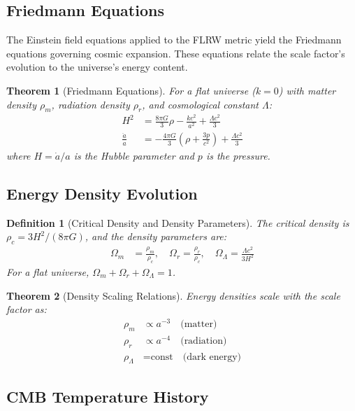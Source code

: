 \documentclass[a4paper, 11pt]{article}
\newtheorem{definition}{Definition}[section]
\newtheorem{theorem}{Theorem}[section]
\begin{document}
\subsection{Friedmann Equations}

The Einstein field equations applied to the FLRW metric yield the Friedmann equations governing
cosmic expansion. These equations relate the scale factor's evolution to the universe's energy content.

\begin{theorem}[Friedmann Equations]
For a flat universe ($k=0$) with matter density $\rho_m$, radiation density $\rho_r$, and
cosmological constant $\Lambda$:
\begin{align}
H^2 &= \frac{8\pi G}{3}\rho - \frac{kc^2}{a^2} + \frac{\Lambda c^2}{3} \\
\frac{\ddot{a}}{a} &= -\frac{4\pi G}{3}\left(\rho + \frac{3p}{c^2}\right) + \frac{\Lambda c^2}{3}
\end{align}
where $H = \dot{a}/a$ is the Hubble parameter and $p$ is the pressure.
\end{theorem}

\subsection{Energy Density Evolution}

\begin{definition}[Critical Density and Density Parameters]
The critical density is $\rho_c = 3H^2/(8\pi G)$, and the density parameters are:
\begin{align}
\Omega_m &= \frac{\rho_m}{\rho_c}, \quad \Omega_r = \frac{\rho_r}{\rho_c}, \quad \Omega_\Lambda = \frac{\Lambda c^2}{3H^2}
\end{align}
For a flat universe, $\Omega_m + \Omega_r + \Omega_\Lambda = 1$.
\end{definition}

\begin{theorem}[Density Scaling Relations]
Energy densities scale with the scale factor as:
\begin{align}
\rho_m &\propto a^{-3} \quad \text{(matter)}\\
\rho_r &\propto a^{-4} \quad \text{(radiation)}\\
\rho_\Lambda &= \text{const} \quad \text{(dark energy)}
\end{align}
\end{theorem}

\subsection{CMB Temperature History}
\end{document}
